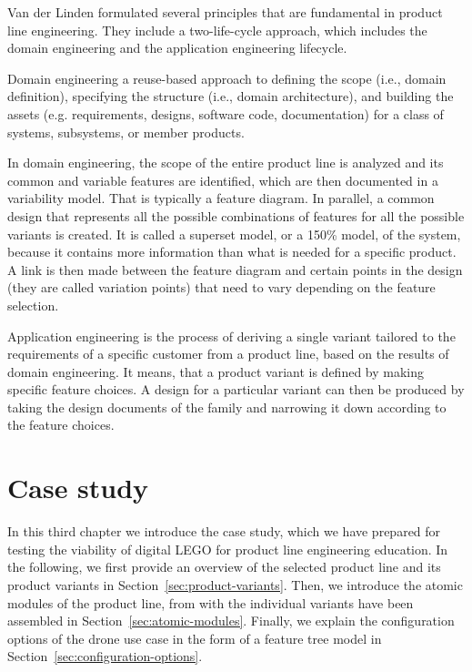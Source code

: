 \documentclass[sigconf,review]{acmart}
\begin{document}
Van der Linden formulated several principles that are fundamental in product line engineering. They include a two-life-cycle approach, which includes the domain engineering and the application engineering lifecycle.

Domain engineering a reuse-based approach to defining the scope (i.e., domain definition), specifying the structure (i.e., domain architecture), and building the assets (e.g. requirements, designs, software code, documentation) for a class of systems, subsystems, or member products.

In domain engineering, the scope of the entire product line is analyzed and its common and variable features are identified, which are then documented in a variability model. That is typically a feature diagram.
In parallel, a common design that represents all the possible combinations of features for all the possible variants is created. It is called a superset model, or a 150\% model, of the system, because it contains more information than what is needed for a specific product.
A link is then made between the feature diagram and certain points in the design (they are called variation points) that need to vary depending on the feature selection.

Application engineering is the process of deriving a single variant tailored to the requirements of a specific customer from a product line, based on the results of domain engineering. 
It means, that a product variant is defined by making specific feature choices. A design for a particular variant can then be produced by taking the design documents of the family and narrowing it down according to the feature choices.


\section{Case study}
\label{sec:case-study}

In this third chapter we introduce the case study, which we have prepared for testing the viability of digital LEGO for product line engineering education.
In the following, we first provide an overview of the selected product line and its product variants in Section~\ref{sec:product-variants}.
Then, we introduce the atomic modules of the product line, from with the individual variants have been assembled in Section~\ref{sec:atomic-modules}.
Finally, we explain the configuration options of the drone use case in the form of a feature tree model in Section~\ref{sec:configuration-options}.
\end{document}
